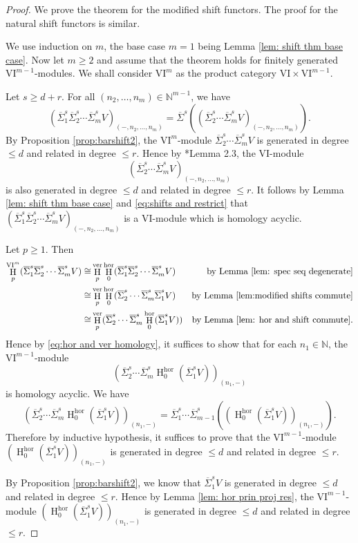 \documentclass{amsart}
\numberwithin{equation}{section}
\DeclareMathOperator{\HH}{H}
\newcommand{\N}{{\mathbb{N}}}
\newcommand{\hor}{{\mathrm{hor}}}
\newcommand{\ver}{{\mathrm{ver}}}
\newcommand{\VI}{{\mathrm{VI}}}
\newcommand{\SSigma}{{\overline{\Sigma}}}
\begin{document}
\begin{proof}
   We prove the theorem for the modified shift functors. The proof for the natural shift functors is similar.

   We use induction on $m$, the base case $m=1$ being Lemma \ref{lem: shift thm base case}. Now let $m\geqslant 2$ and assume that the theorem holds for finitely generated $\VI^{m-1}$-modules. We shall consider $\VI^m$ as the product category $\VI \times \VI^{m-1}$.
   
   Let $s\geqslant d+r$. For all $(n_2, \ldots, n_m)\in \N^{m-1}$, we have
   \begin{equation} \label{eq:shifts and restrict}
      (\SSigma_1^s \SSigma_2^s \cdots \SSigma_m^s V)_{(-, n_2, \ldots, n_m)} = \SSigma^s ((\SSigma_2^s \cdots \SSigma_m^s V)_{(-, n_2, \ldots, n_m)}). 
   \end{equation}
      By Proposition \ref{prop:barshift2}, the $\VI^m$-module $\SSigma_2^s \cdots \SSigma_m^s V$ is generated in degree $\leqslant d$ and related in degree $\leqslant r$. 
   Hence by \cite{gta}*{Lemma 2.3}, the $\VI$-module 
   \[ (\SSigma_2^s \cdots \SSigma_m^s V)_{(-, n_2, \ldots, n_m)} \] 
   is also generated in degree $\leqslant d$ and related in degree $\leqslant r$. It follows by Lemma \ref{lem: shift thm base case} and \eqref{eq:shifts and restrict} that $(\SSigma_1^s \SSigma_2^s \cdots \SSigma_m^s V)_{(-, n_2, \ldots, n_m)}$ is a $\VI$-module which is homology acyclic. 
 
   Let $p\geqslant 1$. Then
   \begin{align*}
      \HH_p^{\VI^m}( \SSigma_1^s \SSigma_2^s \cdots \SSigma_m^s V ) 
      \cong & \HH_p^\ver \HH_0^\hor ( \SSigma_1^s \SSigma_2^s \cdots \SSigma_m^s V ) & \mbox{by Lemma \ref{lem: spec seq degenerate}}\\
      \cong & \HH_p^\ver \HH_0^\hor ( \SSigma_2^s \cdots \SSigma_m^s \SSigma_1^s V ) & \mbox{by Lemma \ref{lem:modified shifts commute}}\\
      \cong & \HH_p^\ver  ( \SSigma_2^s \cdots \SSigma_m^s \HH_0^\hor(\SSigma_1^s V) ) & \mbox{by Lemma \ref{lem: hor and shift commute}}. 
   \end{align*}
   Hence by \eqref{eq:hor and ver homology}, it suffices to show that for each $n_1\in \N$, the $\VI^{m-1}$-module 
   \[ ( \SSigma_2^s \cdots \SSigma_m^s \HH_0^\hor(\SSigma_1^s V) )_{(n_1, -)} \]
   is homology acyclic. We have 
   \[  ( \SSigma_2^s \cdots \SSigma_m^s \HH_0^\hor(\SSigma_1^s V) )_{(n_1, -)} 
      = \SSigma_1^s \cdots \SSigma_{m-1}^s ((\HH_0^\hor(\SSigma_1^s V) )_{(n_1, -)}).  \]
   Therefore by inductive hypothesis, it suffices to prove that the $\VI^{m-1}$-module $(\HH_0^\hor(\SSigma_1^s V) )_{(n_1, -)}$ is generated in degree $\leqslant d$ and related in degree $\leqslant r$. 

   By Proposition \ref{prop:barshift2}, we know that $\SSigma_1^s V$ is generated in degree $\leqslant d$ and related in degree $\leqslant r$. Hence by Lemma \ref{lem: hor prin proj res}, the $\VI^{m-1}$-module $(\HH_0^\hor(\SSigma_1^s V) )_{(n_1, -)}$ is generated in degree $\leqslant d$ and related in degree $\leqslant r$.
\end{proof}
\end{document}
